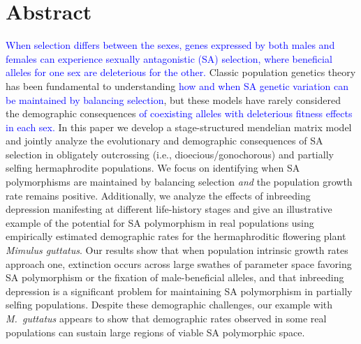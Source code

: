 \documentclass[11pt]{article}
\begin{document}
\linenumbers{}
\modulolinenumbers[3]

\newpage{}



\newpage{}
\section*{Abstract}


\textcolor{blue}{When selection differs between the sexes, genes expressed by both males and females can experience sexually antagonistic (SA) selection, where beneficial alleles for one sex are deleterious for the other.} Classic population genetics theory has been fundamental to understanding \textcolor{blue}{how and when SA genetic variation can be maintained by balancing selection}, but these models have rarely considered the demographic consequences \textcolor{blue}{of coexisting alleles with deleterious fitness effects in each sex.} In this paper we develop a stage-structured mendelian matrix model and jointly analyze the evolutionary and demographic consequences of SA selection in obligately outcrossing (i.e., dioecious/gonochorous) and partially selfing hermaphrodite populations. We focus on identifying when SA polymorphisms are maintained by balancing selection {\itshape and} the population growth rate remains positive. Additionally, we analyze the effects of inbreeding depression manifesting at different life-history stages and give an illustrative example of the potential for SA polymorphism in real populations using empirically estimated demographic rates for the hermaphroditic flowering plant {\itshape Mimulus guttatus}. Our results show that when population intrinsic growth rates approach one, extinction occurs across large swathes of parameter space favoring SA polymorphism or the fixation of male-beneficial alleles, and that inbreeding depression is a significant problem for maintaining SA polymorphism in partially selfing populations. Despite these demographic challenges, our example with {\itshape M.~guttatus} appears to show that demographic rates observed in some real populations can sustain large regions of viable SA polymorphic space.
\end{document}
